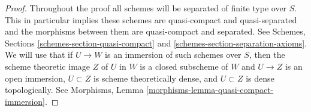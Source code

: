 \begin{proof}

Throughout the proof all schemes will be separated of finite type over $S$.
This in particular implies these schemes are quasi-compact and quasi-separated
and the morphisms between them are quasi-compact and separated.
See Schemes, Sections \ref{schemes-section-quasi-compact} and
\ref{schemes-section-separation-axioms}.
We will use that if $U \to W$ is an immersion of such schemes over $S$,
then the scheme theoretic image $Z$ of $U$ in $W$ is a closed subscheme
of $W$ and $U \to Z$ is an open immersion, $U \subset Z$ is scheme
theoretically dense, and $U \subset Z$ is dense topologically. See
Morphisms, Lemma
\ref{morphisms-lemma-quasi-compact-immersion}.


\end{proof}
